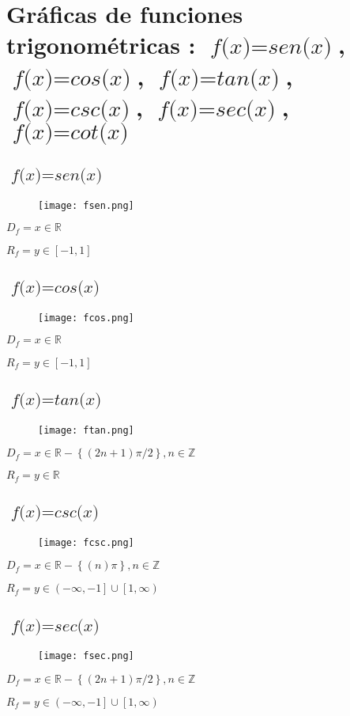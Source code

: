 \documentclass[12pt]{article}
\begin{document}
\section{Gráficas de funciones {\cyan trigonométricas }: $\textit{f(x)} = \textit{sen(x)}$, $\textit{f(x)} = \textit{cos(x)}$, $\textit{f(x)} = \textit{tan(x)}$, $\textit{f(x)} = \textit{csc(x)}$, $\textit{f(x)} = \textit{sec(x)}$, $\textit{f(x)} = \textit{cot(x)}$} 
\subsection{$\textit{f(x)} = \textit{sen(x)}$}
\begin{figure}[htb] \centering \texttt{[image: fsen.png]} 
\end{figure}
$D_f = x \in \mathbb{R}$ \par
$R_f = y \in \left[-1,1\right]$ 
\subsection{$\textit{f(x)} = \textit{cos(x)}$}
\begin{figure}[htb] \centering \texttt{[image: fcos.png]} 
\end{figure}
$D_f = x \in \mathbb{R}$ \par
$R_f = y \in \left[-1,1\right]$ 
\subsection{$\textit{f(x)} = \textit{tan(x)}$}
\begin{figure}[htb] \centering \texttt{[image: ftan.png]} 
\end{figure}
$D_f = x \in \mathbb{R} - \left\lbrace\left(2n +1\right)\pi/2\right\rbrace, n \in \mathbb{Z}$ \par
$R_f = y \in \mathbb{R}$ 
\subsection{$\textit{f(x)} = \textit{csc(x)}$}
\begin{figure}[htb] \centering \texttt{[image: fcsc.png]} 
\end{figure}
$D_f = x \in \mathbb{R} - \left\lbrace\left(n\right)\pi\right\rbrace, n \in \mathbb{Z}$ \par
$R_f = y \in \left(-\infty,-1\right] \cup \left[1,\infty\right)$ 
\newpage
\subsection{$\textit{f(x)} = \textit{sec(x)}$}
\begin{figure}[htb] \centering \texttt{[image: fsec.png]} 
\end{figure}
$D_f = x \in \mathbb{R} - \left\lbrace\left(2n +1\right)\pi/2\right\rbrace, n \in \mathbb{Z}$ \par
$R_f = y \in \left(-\infty,-1\right] \cup \left[1,\infty\right) $ 
\end{document}
